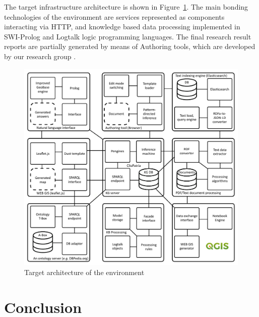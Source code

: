\documentclass[
]{ceurart}
\begin{document}
The target infrastructure architecture is shown in Figure~\ref{fig:target}.  The main bonding technologies of the environment are services represented as components interacting via HTTP, and knowledge based data processing implemented in SWI-Prolog and Logtalk logic programming languages.  The final research result reports are partially generated by means of Authoring tools, which are developed by our research group \cite{authoring}.
\begin{figure}
  \centering
  \includegraphics[width=0.8\linewidth]{architecture.pdf}
  \caption{Target architecture of the environment}
  \label{fig:target}
\end{figure}

\section*{Conclusion}
\end{document}

